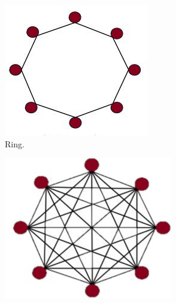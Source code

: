 \begin{figure}[H]\centering
  \begin{subfigure}[b]{0.23\textwidth}
\includegraphics[width=\textwidth]{Part 2 - Search-Based Optimization/Particle Swarm Optimization/Images/RING.jpg}
    \caption{Ring.}
    \label{fig:ringtopology}
  \end{subfigure}
 \hfill
  \begin{subfigure}[b]{0.23\textwidth}
    \includegraphics[width=\textwidth]{Part 2 - Search-Based Optimization/Particle Swarm Optimization/Images/STAR.jpg}

\end{subfigure}
\end{figure}
